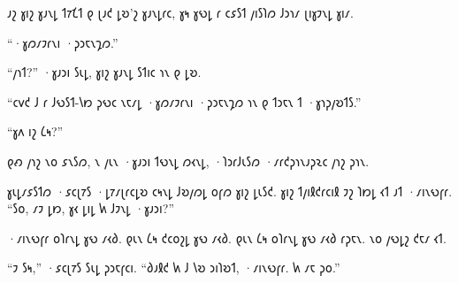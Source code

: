 𐑨𐑟 𐑣𐑦𐑟 𐑣𐑨𐑯𐑛 𐑑𐑳𐑗𐑑 𐑞 𐑚𐑨𐑒 𐑛𐑹'𐑟 𐑣𐑨𐑯𐑛𐑩𐑤, 𐑣𐑰 𐑣𐑻𐑛 𐑩 𐑤𐑭𐑕𐑑 𐑢𐑦𐑕𐑐𐑼 𐑓𐑮𐑪𐑥 𐑚𐑦𐑣𐑲𐑯𐑛 𐑣𐑦𐑥.

“·𐑣𐑼𐑥𐑲𐑩𐑯𐑦 ·𐑜𐑮𐑱𐑯𐑡𐑼.”

“𐑢𐑪𐑑?” ·𐑣𐑨𐑮𐑦 𐑕𐑧𐑛, 𐑣𐑦𐑟 𐑣𐑨𐑯𐑛 𐑕𐑑𐑦𐑤 𐑪𐑯 𐑞 𐑛𐑹.

“𐑤𐑫𐑒 𐑓 𐑩 𐑓𐑻𐑕𐑑-𐑘𐑽 𐑜𐑻𐑤 𐑯𐑱𐑥𐑛 ·𐑣𐑼𐑥𐑲𐑩𐑯𐑦 ·𐑜𐑮𐑱𐑯𐑡𐑼 𐑪𐑯 𐑞 𐑑𐑮𐑱𐑯 𐑑 ·𐑣𐑪𐑜𐑢𐑹𐑑𐑕.”

“𐑣𐑵 𐑦𐑟 𐑖𐑰?”

𐑞𐑺 𐑢𐑪𐑟 𐑯𐑴 𐑭𐑯𐑕𐑼, 𐑯 𐑢𐑧𐑯 ·𐑣𐑨𐑮𐑦 𐑑𐑻𐑯𐑛 𐑼𐑬𐑯𐑛, ·𐑐𐑮𐑩𐑓𐑧𐑕𐑼 ·𐑥𐑩𐑒𐑜𐑪𐑯𐑨𐑜𐑷𐑤 𐑢𐑪𐑟 𐑜𐑪𐑯.


𐑣𐑧𐑛𐑥𐑭𐑕𐑑𐑼 ·𐑭𐑤𐑚𐑳𐑕 ·𐑛𐑳𐑥𐑚𐑩𐑤𐑛𐑹 𐑤𐑰𐑯𐑛 𐑓𐑹𐑢𐑼𐑛 𐑴𐑝𐑼 𐑣𐑦𐑟 𐑛𐑧𐑕𐑒. 𐑣𐑦𐑟 𐑑𐑢𐑦𐑙𐑒𐑩𐑤𐑦𐑙 𐑲𐑟 𐑐𐑽𐑛 𐑬𐑑 𐑨𐑑 ·𐑥𐑦𐑯𐑻𐑝𐑩. “𐑕𐑴, 𐑥𐑲 𐑛𐑽, 𐑣𐑬 𐑛𐑦𐑛 𐑿 𐑓𐑲𐑯𐑛 ·𐑣𐑨𐑮𐑦?”

·𐑥𐑦𐑯𐑻𐑝𐑩 𐑴𐑐𐑩𐑯𐑛 𐑣𐑻 𐑥𐑬𐑔. 𐑞𐑧𐑯 𐑖𐑰 𐑒𐑤𐑴𐑟𐑛 𐑣𐑻 𐑥𐑬𐑔. 𐑞𐑧𐑯 𐑖𐑰 𐑴𐑐𐑩𐑯𐑛 𐑣𐑻 𐑥𐑬𐑔 𐑩𐑜𐑱𐑯. 𐑯𐑴 𐑢𐑻𐑛𐑟 𐑒𐑱𐑥 𐑬𐑑.

“𐑲 𐑕𐑰,” ·𐑭𐑤𐑚𐑳𐑕 𐑕𐑧𐑛 𐑜𐑮𐑱𐑝𐑤𐑦. “𐑔𐑨𐑙𐑒 𐑿 𐑓 𐑘𐑹 𐑮𐑦𐑐𐑹𐑑, ·𐑥𐑦𐑯𐑻𐑝𐑩. 𐑿 𐑥𐑱 𐑜𐑴.”


